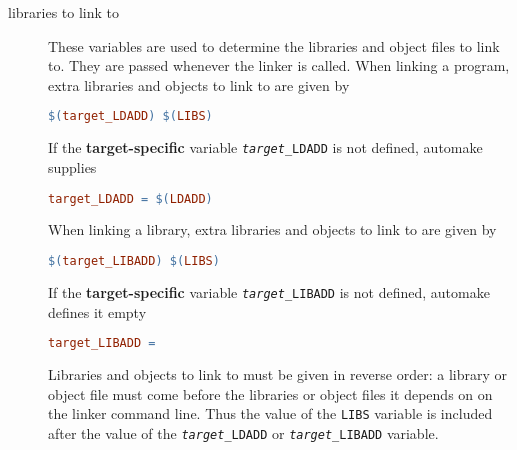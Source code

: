 \documentclass[11pt,a4paper,headinclude,footinclude,DIV16,normalheadings]{scrartcl}
\begin{document}
\begin{description}
\item[libraries to link to] These variables are used to determine the
  libraries and object files to link to.  They are passed whenever the linker
  is called.  When
  linking a program, extra libraries and objects to link to are given by
  \begin{lstlisting}[language=make]
$(target_LDADD) $(LIBS)
  \end{lstlisting}
  If the {\bf target-specific} variable \texttt{\textit{target}\_LDADD} is not
  defined, automake supplies
  \begin{lstlisting}[language=make]
target_LDADD = $(LDADD)
  \end{lstlisting}
  When linking a library, extra libraries and objects to link to are given by
  \begin{lstlisting}[language=make]
$(target_LIBADD) $(LIBS)
  \end{lstlisting}
  If the {\bf target-specific} variable \texttt{\textit{target}\_LIBADD} is
  not defined, automake defines it empty
  \begin{lstlisting}[language=make]
target_LIBADD =
  \end{lstlisting}
  Libraries and objects to link to must be given in reverse order: a library
  or object file must come before the libraries or object files it depends on
  on the linker command line.  Thus the value of the \texttt{LIBS} variable is
  included after the value of the \texttt{\textit{target}\_LDADD} or
  \texttt{\textit{target}\_LIBADD} variable.


\end{description}
\end{document}
